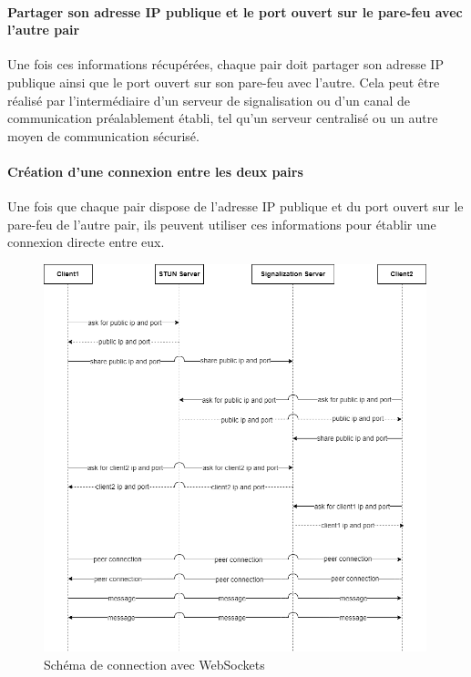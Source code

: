\paragraph{Partager son adresse IP publique et le port ouvert sur le pare-feu avec l'autre pair}

Une fois ces informations récupérées, chaque pair doit partager son adresse IP publique ainsi que le port ouvert sur son pare-feu avec l'autre. Cela peut être réalisé par l'intermédiaire d'un serveur de signalisation 
ou d'un canal de communication préalablement établi, tel qu'un serveur centralisé ou un autre moyen de communication sécurisé.

\paragraph{Création d'une connexion entre les deux pairs}

Une fois que chaque pair dispose de l'adresse IP publique et du port ouvert sur le pare-feu de l'autre pair, ils peuvent utiliser ces informations pour établir une connexion directe entre eux. 


\newpage
\begin{figure}[ht]
    \centering
    \includegraphics[width=0.99\textwidth]{assets/socket.png}
    \caption{Schéma de connection avec WebSockets}
    \label{fig:websockets}
\end{figure}



